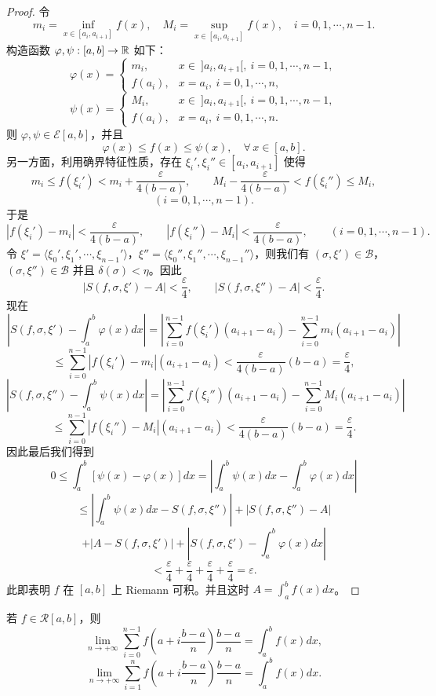\begin{proof}
	令
	\[
	m_i=\inf_{x\in[a_i,a_{i+1}]}f(x),\quad M_i=\sup_{x\in[a_i,a_{i+1}]}f(x),\quad i=0,1,\cdots,n-1.
	\]
	构造函数 \(\varphi,\psi:[a,b]\to\mathbb{R}\) 如下：
	\[
	\varphi(x)=\begin{cases} m_i, & x\in\ ]a_i,a_{i+1}[,\ i=0,1,\cdots,n-1, \\ f(a_i), & x=a_i,\ i=0,1,\cdots,n, \end{cases}
	\]
	\[
	\psi(x)=\begin{cases} M_i, & x\in\ ]a_i,a_{i+1}[,\ i=0,1,\cdots,n-1, \\ f(a_i), & x=a_i,\ i=0,1,\cdots,n. \end{cases}
	\]
	则 \(\varphi,\psi\in\mathscr{E}[a,b]\)，并且
	\[
	\varphi(x)\le f(x)\le\psi(x),\quad\forall\,x\in[a,b].
	\]
	另一方面，利用确界特征性质，存在 \(\xi_i',\xi_i''\in[a_i,a_{i+1}]\) 使得
	\[
	m_i\le f(\xi_i')<m_i+\frac{\varepsilon}{4(b-a)},\qquad M_i-\frac{\varepsilon}{4(b-a)}<f(\xi_i'')\le M_i,
	\]
	\[
	(i=0,1,\cdots,n-1).
	\]
	于是
	\[
	|f(\xi_i')-m_i|<\frac{\varepsilon}{4(b-a)},\qquad |f(\xi_i'')-M_i|<\frac{\varepsilon}{4(b-a)},\qquad(i=0,1,\cdots,n-1).
	\]
	令 \(\xi'=\langle\xi_0',\xi_1',\cdots,\xi_{n-1}'\rangle\)，\(\xi''=\langle\xi_0'',\xi_1'',\cdots,\xi_{n-1}''\rangle\)，则我们有 \((\sigma,\xi')\in\mathscr{B}\)，\((\sigma,\xi'')\in\mathscr{B}\) 并且 \(\delta(\sigma)<\eta\)。因此
	\[
	|S(f,\sigma,\xi')-A|<\frac{\varepsilon}{4},\qquad |S(f,\sigma,\xi'')-A|<\frac{\varepsilon}{4}.
	\]
	现在
	\[
	\left|S(f,\sigma,\xi')-\int_a^b\varphi(x)dx\right|
	=\left|\sum_{i=0}^{n-1}f(\xi_i')(a_{i+1}-a_i)-\sum_{i=0}^{n-1}m_i(a_{i+1}-a_i)\right|
	\]
	\[
	\le\sum_{i=0}^{n-1}|f(\xi_i')-m_i|(a_{i+1}-a_i)<\frac{\varepsilon}{4(b-a)}(b-a)=\frac{\varepsilon}{4},
	\]
	\[
	\left|S(f,\sigma,\xi'')-\int_a^b\psi(x)dx\right|
	=\left|\sum_{i=0}^{n-1}f(\xi_i'')(a_{i+1}-a_i)-\sum_{i=0}^{n-1}M_i(a_{i+1}-a_i)\right|
	\]
	\[
	\le\sum_{i=0}^{n-1}|f(\xi_i'')-M_i|(a_{i+1}-a_i)<\frac{\varepsilon}{4(b-a)}(b-a)=\frac{\varepsilon}{4}.
	\]
	因此最后我们得到
	\[
	0\le\int_a^b[\psi(x)-\varphi(x)]dx=\left|\int_a^b\psi(x)dx-\int_a^b\varphi(x)dx\right|
	\]
	\[
	\le\left|\int_a^b\psi(x)dx-S(f,\sigma,\xi'')\right|+|S(f,\sigma,\xi'')-A|
	\]
	\[
	+|A-S(f,\sigma,\xi')|+\left|S(f,\sigma,\xi')-\int_a^b\varphi(x)dx\right|
	\]
	\[
	<\frac{\varepsilon}{4}+\frac{\varepsilon}{4}+\frac{\varepsilon}{4}+\frac{\varepsilon}{4}=\varepsilon.
	\]
	此即表明 \(f\) 在 \([a,b]\) 上 Riemann 可积。并且这时 \(A=\displaystyle\int_a^b f(x)dx\)。

\end{proof}

\begin{mycor*}{}

	若 \(f\in\mathscr{R}[a,b]\)，则
	\[
	\lim_{n\to+\infty}\sum_{i=0}^{n-1}f\left(a+i\frac{b-a}{n}\right)\frac{b-a}{n}=\int_a^b f(x)dx,
	\]
	\[
	\lim_{n\to+\infty}\sum_{i=1}^n f\left(a+i\frac{b-a}{n}\right)\frac{b-a}{n}=\int_a^b f(x)dx.
	\]

\end{mycor*}

